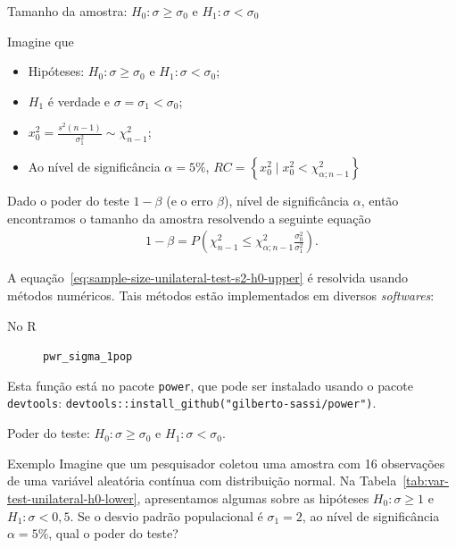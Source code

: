 \documentclass[8pt]{beamer}
\begin{document}
\begin{frame}{Tamanho da amostra: $H_0: \sigma \geq \sigma_0$ e $H_1: \sigma < \sigma_0$}

Imagine que
\begin{itemize}
	\item Hipóteses: $H_0: \sigma \geq \sigma_0$ e $H_1: \sigma < \sigma_0$;
	\item $H_1$ é verdade e $\sigma = \sigma_1 < \sigma_0$;
	\item $x_0^2 = \frac{s^2(n-1)}{\sigma_1^2} \sim \chi_{n-1}^2$;
	\item Ao nível de significância $\alpha=5\%$,  $RC=\left\{ x_0^2 \mid x_0^2 < \chi_{\alpha; n-1}^2 \right\}$
\end{itemize}
\vfill

Dado o poder do teste $1-\beta$ (e o erro $\beta$), nível de significância $\alpha$, então encontramos o tamanho da amostra resolvendo a seguinte equação
\begin{align} \label{eq:sample-size-unilateral-test-s2-h0-upper}
	1-\beta = P \left( \chi_{n-1}^2 \leq \chi_{\alpha; n-1}^2 \frac{\sigma_0^2}{\sigma_1^2} \right).
\end{align}

A equação~\eqref{eq:sample-size-unilateral-test-s2-h0-upper} é resolvida usando métodos numéricos. Tais métodos estão implementados em diversos \textit{softwares}:
\begin{description}
	\item[No R] \lstinline|pwr_sigma_1pop|
\end{description}

Esta função está no pacote \lstinline|power|, que pode ser instalado usando o pacote \lstinline|devtools|: \lstinline|devtools::install_github("gilberto-sassi/power")|.
\end{frame}

\begin{frame}{Poder do teste: $H_0: \sigma \geq \sigma_0$ e $H_1: \sigma < \sigma_0$.}

\large

\begin{block}{Exemplo}
	Imagine que um pesquisador coletou uma amostra com 16 observações de uma variável aleatória contínua com distribuição normal. Na Tabela~\ref{tab:var-test-unilateral-h0-lower}, apresentamos algumas sobre as hipóteses $H_0: \sigma \geq 1$ e $H_1: \sigma < 0,5$. Se o desvio padrão populacional é $\sigma_1 = 2$, ao nível de significância $\alpha=5\%$, qual o poder do teste?
	\begin{table}[ht]
		\centering
		\caption{Algumas informações do experimento.} 
		\label{tab:var-test-unilateral-h0-lower}
	\end{table}
\end{block}
\normalsize

\end{frame}
\end{document}
